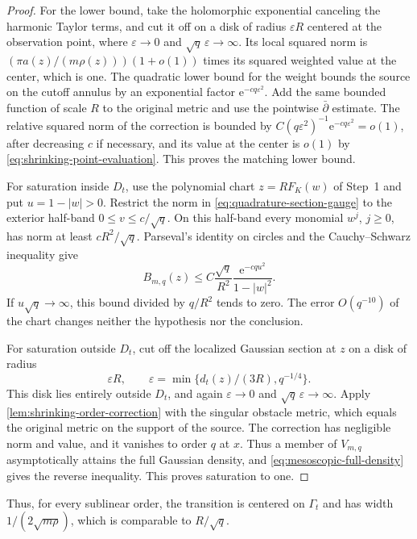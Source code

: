\begin{proof}
For the lower bound, take the holomorphic exponential canceling the harmonic Taylor terms, and cut it off on a disk of radius $\varepsilon R$ centered at the observation point, where $\varepsilon\to0$ and $\sqrt q\,\varepsilon\to\infty$. Its local squared norm is
$(\pi a(z)/(m\rho(z)))(1+o(1))$ times its squared weighted value at the center, which is one. The quadratic lower bound for the weight bounds the source on the cutoff annulus by an exponential factor $\mathrm{e}^{-cq\varepsilon^2}$. Add the same bounded function of scale $R$ to the original metric and use the pointwise $\bar\partial$ estimate. The relative squared norm of the correction is bounded by
$C(q\varepsilon^2)^{-1}\mathrm{e}^{-cq\varepsilon^2}=o(1)$, after decreasing $c$ if necessary, and its value at the center is $o(1)$ by \eqref{eq:shrinking-point-evaluation}. This proves the matching lower bound.

For saturation inside $D_t$, use the polynomial chart $z=RF_K(w)$ of Step~1 and put $u=1-|w|>0$. Restrict the norm in \eqref{eq:quadrature-section-gauge} to the exterior half-band $0\leq v\leq c/\sqrt q$. On this half-band every monomial $w^j$, $j\geq0$, has norm at least $cR^2/\sqrt q$. Parseval's identity on circles and the Cauchy--Schwarz inequality give
\[
 B_{m,q}(z)\leq
 C\frac{\sqrt q}{R^2}\frac{\mathrm{e}^{-cqu^2}}{1-|w|^2}.
\]
If $u\sqrt q\to\infty$, this bound divided by $q/R^2$ tends to zero. The error $O(q^{-10})$ of the chart changes neither the hypothesis nor the conclusion.

For saturation outside $D_t$, cut off the localized Gaussian section at $z$ on a disk of radius
\[
 \varepsilon R,\qquad
 \varepsilon=\min\{d_t(z)/(3R),q^{-1/4}\}.
\]
This disk lies entirely outside $D_t$, and again $\varepsilon\to0$ and
$\sqrt q\,\varepsilon\to\infty$. Apply \cref{lem:shrinking-order-correction} with the singular obstacle metric, which equals the original metric on the support of the source. The correction has negligible norm and value, and it vanishes to order $q$ at $x$. Thus a member of $V_{m,q}$ asymptotically attains the full Gaussian density, and \eqref{eq:mesoscopic-full-density} gives the reverse inequality. This proves saturation to one.
\end{proof}

Thus, for every sublinear order, the transition is centered on $\Gamma_t$ and has width $1/(2\sqrt{m\rho})$, which is comparable to $R/\sqrt q$.
